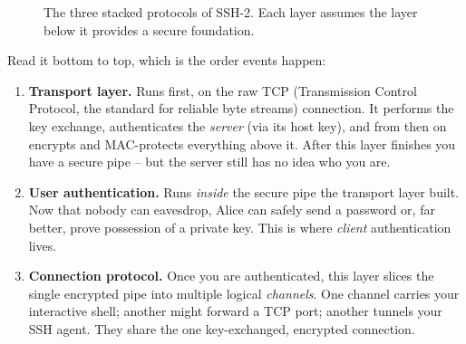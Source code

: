 \begin{figure}[htbp]
\centering
{}
\caption{The three stacked protocols of SSH-2. Each layer assumes the layer below it provides a secure foundation.}
\label{fig:ssh-layers}
\end{figure}

Read it bottom to top, which is the order events happen:

\begin{enumerate}
  \item \textbf{Transport layer.} Runs first, on the raw TCP (Transmission Control Protocol, the standard for reliable byte streams) connection. It performs the key exchange, authenticates the \emph{server} (via its host key), and from then on encrypts and MAC-protects everything above it. After this layer finishes you have a secure pipe -- but the server still has no idea who you are.
  \item \textbf{User authentication.} Runs \emph{inside} the secure pipe the transport layer built. Now that nobody can eavesdrop, Alice can safely send a password or, far better, prove possession of a private key. This is where \emph{client} authentication lives.
  \item \textbf{Connection protocol.} Once you are authenticated, this layer slices the single encrypted pipe into multiple logical \emph{channels}. One channel carries your interactive shell; another might forward a TCP port; another tunnels your SSH agent. They share the one key-exchanged, encrypted connection.
\end{enumerate}

